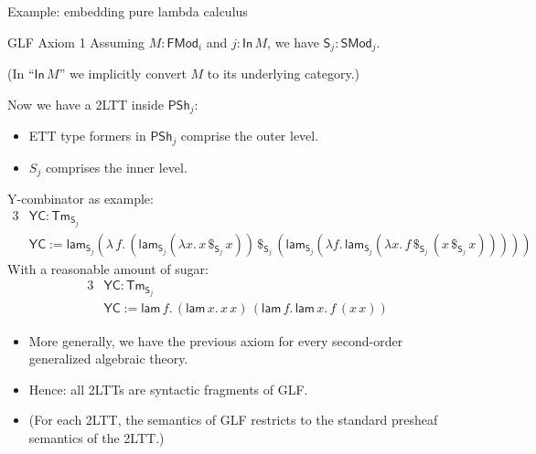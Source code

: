 \documentclass[dvipsnames,aspectratio=169]{beamer}
\newcommand{\ms}[1]{\mathsf{#1}}
\newcommand{\Tm}{\mathsf{Tm}}
\newcommand{\In}{\mathsf{In}}
\newcommand{\PSh}{\mathsf{PSh}}
\newcommand{\SMod}{\mathsf{SMod}}
\newcommand{\FMod}{\mathsf{FMod}}
\renewcommand{\S}{\mathsf{S}}
\newcommand{\lam}{\ms{lam}}
\begin{document}
\begin{frame}{Example: embedding pure lambda calculus}

\begin{block}{GLF Axiom 1}
  Assuming $M : \FMod_i$ and $j : \In\,M$, we have $\S_j : \SMod_j$.

  {\footnotesize (In ``$\In\,M$'' we implicitly convert $M$ to its underlying category.)}
\end{block}
\vspace{0.5em}

Now we have a 2LTT inside $\PSh_j$:
\begin{itemize}
\item ETT type formers in $\PSh_j$ comprise the outer level.
\item $S_j$ comprises the inner level.
\end{itemize}
\vspace{0.5em}
\pause
Y-combinator as example:
\begin{alignat*}{3}
  & \ms{YC} : \Tm_{\S_j} \\
  & \ms{YC} := \lam_{\S_j}(\lambda\,f.\,(\lam_{\S_j} (\lambda x.\, x\,\$_{\S_j}\,x))\,\$_{\S_j}\,
               (\lam_{\S_j} (\lambda f.\,\lam_{\S_j} (\lambda x.\, f \,\$_{\S_j}\, (x \,\$_{\S_j}\, x)))))
\end{alignat*}
\pause
With a reasonable amount of sugar:
\begin{alignat*}{3}
  & \ms{YC} : \Tm_{\S_j} \\
  & \ms{YC} := \lam\,f.\,(\lam\,x.\,x\,x)\,(\lam\,f.\,\lam\,x.\,f\,(x\,x))
\end{alignat*}

\end{frame}

\begin{frame}{}

\begin{itemize}
\item More generally, we have the previous axiom for every second-order generalized algebraic theory.
\item Hence: all 2LTTs are syntactic fragments of GLF.
\item (For each 2LTT, the semantics of GLF restricts to the standard presheaf semantics of the 2LTT.)
\end{itemize}


\end{frame}
\end{document}

